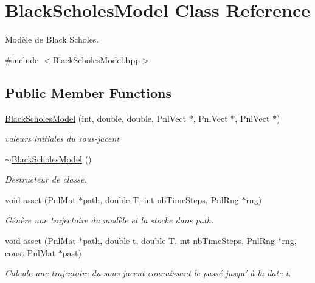 \hypertarget{classBlackScholesModel}{\section{Black\-Scholes\-Model Class Reference}
\label{classBlackScholesModel}
}


Modèle de Black Scholes.  




{\ttfamily \#include $<$Black\-Scholes\-Model.\-hpp$>$}

\subsection*{Public Member Functions}
\begin{DoxyCompactItemize}
\item 
\hyperlink{classBlackScholesModel_abf5c7baafc243266094d4aca57016646}{Black\-Scholes\-Model} (int, double, double, Pnl\-Vect $\ast$, Pnl\-Vect $\ast$, Pnl\-Vect $\ast$)
\begin{DoxyCompactList}\small\item\em valeurs initiales du sous-\/jacent \end{DoxyCompactList}\item 
\hyperlink{classBlackScholesModel_a1f273e39d33b27280f87004c1480635b}{$\sim$\-Black\-Scholes\-Model} ()
\begin{DoxyCompactList}\small\item\em Destructeur de classe. \end{DoxyCompactList}\item 
void \hyperlink{classBlackScholesModel_a71ed54a0ca9a89b87610ff699814e120}{asset} (Pnl\-Mat $\ast$path, double T, int nb\-Time\-Steps, Pnl\-Rng $\ast$rng)
\begin{DoxyCompactList}\small\item\em Génère une trajectoire du modèle et la stocke dans path. \end{DoxyCompactList}\item 
void \hyperlink{classBlackScholesModel_a4ae6f779b9f22255640241e1ed37fbe1}{asset} (Pnl\-Mat $\ast$path, double t, double T, int nb\-Time\-Steps, Pnl\-Rng $\ast$rng, const Pnl\-Mat $\ast$past)
\begin{DoxyCompactList}\small\item\em Calcule une trajectoire du sous-\/jacent connaissant le passé jusqu' à la date t. \end{DoxyCompactList}\item 

\end{DoxyCompactItemize}
